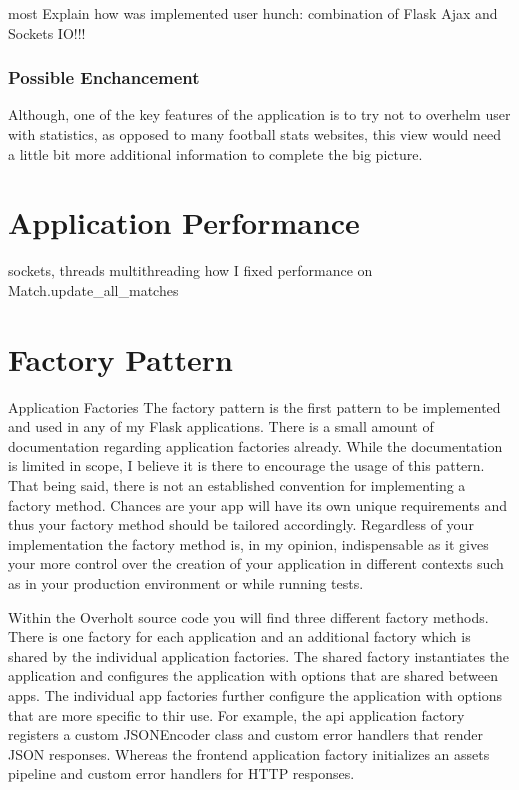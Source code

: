 most Explain how was implemented user hunch: combination of Flask Ajax and Sockets IO!!!
 
 \subsubsection{Possible Enchancement}
\label{subsubsec:upcomingmatchviewenchancement}

Although, one of the key features of the application is to try not to overhelm user with statistics, as opposed to many football stats websites, this view would need a little bit more additional information to complete the big picture.

\section{Application Performance}
sockets, threads
multithreading
how I fixed performance on Match.update\_all\_matches


\section{Factory Pattern}
Application Factories
The factory pattern is the first pattern to be implemented and used in any of my Flask applications. There is a small amount of documentation regarding application factories already. While the documentation is limited in scope, I believe it is there to encourage the usage of this pattern. That being said, there is not an established convention for implementing a factory method. Chances are your app will have its own unique requirements and thus your factory method should be tailored accordingly. Regardless of your implementation the factory method is, in my opinion, indispensable as it gives your more control over the creation of your application in different contexts such as in your production environment or while running tests.

Within the Overholt source code you will find three different factory methods. There is one factory for each application and an additional factory which is shared by the individual application factories. The shared factory instantiates the application and configures the application with options that are shared between apps. The individual app factories further configure the application with options that are more specific to thir use. For example, the api application factory registers a custom JSONEncoder class and custom error handlers that render JSON responses. Whereas the frontend application factory initializes an assets pipeline and custom error handlers for HTTP responses.

